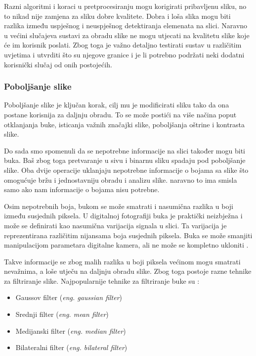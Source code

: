 \documentclass{foi}
\begin{document}
Razni algoritmi i koraci u pretprocesiranju mogu korigirati pribavljenu sliku, no to nikad nije zamjena za sliku dobre kvalitete. Dobra i loša slika mogu biti razlika između uspješnog i neuspješnog detektiranja elemenata na slici. Naravno u većini slučajeva sustavi za obradu slike ne mogu utjecati na kvalitetu slike koje će im korisnik poslati. Zbog toga je važno detaljno testirati sustav u različitim uvjetima i utvrditi što su njegove granice i je li potrebno podržati neki dodatni korisnički slučaj od onih postojećih.
\subsubsection{Poboljšanje slike}

Poboljšanje slike je ključan korak, cilj mu je modificirati sliku tako da ona postane korisnija za daljnju obradu. To se može postići na više načina poput otklanjanja buke, isticanja važnih značajki slike, poboljšanja oštrine i kontrasta slike.

Do sada smo spomenuli da se nepotrebne informacije na slici također mogu biti buka. Baš zbog toga pretvaranje u sivu i binarnu sliku spadaju pod poboljšanje slike. Oba dvije operacije uklanjaju nepotrebne informacije o bojama sa slike što omogućuje bržu i jednostavniju obradu i analizu slike. naravno to ima smisla samo ako nam informacije o bojama nisu potrebne.

Osim nepotrebnih boja, bukom se može smatrati i nasumična razlika u boji između susjednih piksela. U digitalnoj fotografiji buka je praktički neizbježna i može se definirati kao nasumična varijacija signala u slici. Ta varijacija je reprezentirana različitim nijansama boja susjednih piksela. Buka se može smanjiti manipulacijom parametara digitalne kamera, ali ne može se kompletno ukloniti \cite{Adobe}.

Takve informacije se zbog malih razlika u boji piksela većinom mogu smatrati nevažnima, a loše utječu na daljnju obradu slike. Zbog toga postoje razne tehnike za filtriranje slike. Najpopularnije tehnike za filtriranje buke su \cite{Swain2023Jul}:

\begin{itemize}
    \item Gaussov filter (\textit{eng. gaussian filter})
    \item Srednji filter (\textit{eng. mean filter})
    \item Medijanski filter (\textit{eng. median filter})
    \item Bilateralni filter (\textit{eng. bilateral filter})
\end{itemize}
\end{document}
